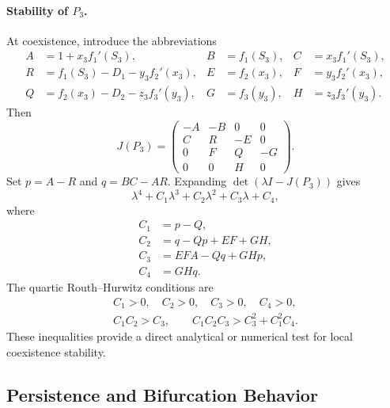 \paragraph{Stability of \(P_3\).}
At coexistence, introduce the abbreviations
\begin{align*}
A&=1+x_3f_1'(S_3), & B&=f_1(S_3), & C&=x_3f_1'(S_3),\\
R&=f_1(S_3)-D_1-y_3f_2'(x_3),
& E&=f_2(x_3), & F&=y_3f_2'(x_3),\\
Q&=f_2(x_3)-D_2-z_3f_3'(y_3),
& G&=f_3(y_3), & H&=z_3f_3'(y_3).
\end{align*}
Then
\begin{equation}
J(P_3)=
\begin{pmatrix}
-A&-B&0&0\\
C&R&-E&0\\
0&F&Q&-G\\
0&0&H&0
\end{pmatrix}.
\end{equation}
Set \(p=A-R\) and \(q=BC-AR\).  Expanding
\(\det(\lambda I-J(P_3))\) gives
\begin{equation}
\lambda^4+C_1\lambda^3+C_2\lambda^2+C_3\lambda+C_4,
\end{equation}
where
\begin{equation}
\label{eq:p3-quartic-coefficients}
\begin{aligned}
C_1&=p-Q,\\
C_2&=q-Qp+EF+GH,\\
C_3&=EFA-Qq+GHp,\\
C_4&=GHq.
\end{aligned}
\end{equation}
The quartic Routh--Hurwitz conditions are
\begin{equation}
\label{eq:p3-stability}
\begin{gathered}
C_1>0,\quad C_2>0,\quad C_3>0,\quad C_4>0,\\
C_1C_2>C_3,\qquad
C_1C_2C_3>C_3^2+C_1^2C_4.
\end{gathered}
\end{equation}
These inequalities provide a direct analytical or numerical test for local
coexistence stability.

\subsection{Persistence and Bifurcation Behavior}


